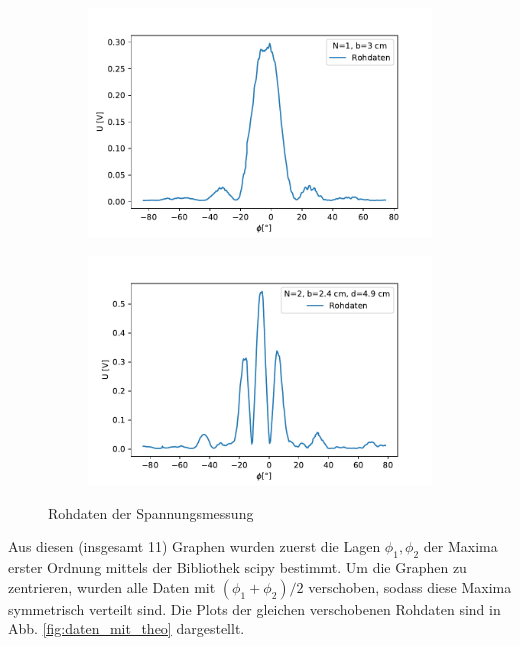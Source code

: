 \documentclass[12pt,a4paper]{article}
\begin{document}
\begin{figure}[H]
	\centering
	\begin{subfigure}{.5\textwidth}
		\centering
		\includegraphics[width=0.9\linewidth]{Rohdaten/Images/einzelspalt_roh_3_3}
	\end{subfigure}%
	\begin{subfigure}{.5\textwidth}
		\centering
		\includegraphics[width=0.9\linewidth]{Rohdaten/Images/doppelspalt_roh_2}
	\end{subfigure}
	\caption{Rohdaten der Spannungsmessung}
	\label{fig:rohdaten}
\end{figure}
Aus diesen (insgesamt 11) Graphen wurden zuerst die Lagen $\phi_1,  \phi_2$ der Maxima erster Ordnung mittels der Bibliothek scipy bestimmt. Um die Graphen zu zentrieren, wurden alle Daten mit $(\phi_1+\phi_2)/2$ verschoben, sodass diese Maxima symmetrisch verteilt sind. Die Plots der gleichen verschobenen Rohdaten sind in Abb. \ref{fig:daten_mit_theo} dargestellt.
\end{document}
